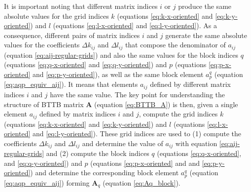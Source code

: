 \documentclass[manuscript,revised]{geophysics}
\begin{document}
It is important noting that different matrix indices $i$ or $j$ produce the same 
absolute values for the grid indices $k$ (equations \ref{eq:k-x-oriented} and
\ref{eq:k-y-oriented}) and $l$ (equations \ref{eq:l-x-oriented} and
\ref{eq:l-y-oriented}). As a consequence, different pairs of matrix indices $i$
and $j$ generate the same absolute values for the coefficients $\Delta k_{ij}$ and
$\Delta l_{ij}$ that compose the denominator of $a_{ij}$ 
(equation \ref{eq:aij-regular-grids}) and also the same values for the block indices
$q$ (equations \ref{eq:q-x-oriented} and \ref{eq:q-y-oriented}) and 
$p$ (equations \ref{eq:p-x-oriented} and \ref{eq:p-y-oriented}), as well as the same
block element $a^{q}_{p}$ (equation \ref{eq:aqp_equiv_aij}). 
It means that elements $a_{ij}$ defined
by different matrix indices $i$ and $j$ have the same value. The key point for
understanding the structure of BTTB matrix $\mathbf{A}$ (equation \ref{eq:BTTB_A})
is then, given a single element $a_{ij}$
defined by matrix indices $i$ and $j$, compute the grid indices 
$k$ (equations \ref{eq:k-x-oriented} and \ref{eq:k-y-oriented}) and
$l$ (equations \ref{eq:l-x-oriented} and \ref{eq:l-y-oriented}).
These grid indices are used to 
(1) compute the coefficients $\Delta k_{ij}$ and 
$\Delta l_{ij}$ and determine the value of $a_{ij}$ with equation 
\ref{eq:aij-regular-grids} and 
(2) compute the block indices $q$ (equations \ref{eq:q-x-oriented}, 
and \ref{eq:q-y-oriented}) and $p$ (equations \ref{eq:p-x-oriented} and
and \ref{eq:p-y-oriented}) and determine the corresponding block element $a^{q}_{p}$ 
(equation \ref{eq:aqp_equiv_aij}) forming $\mathbf{A}_{q}$ (equation \ref{eq:Aq_block}). 
\end{document}
